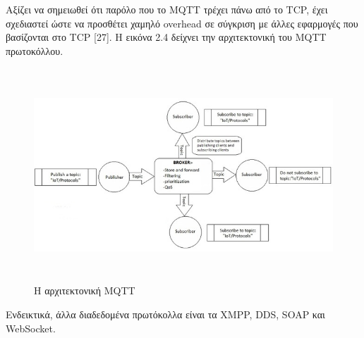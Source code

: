 Aξίζει να σημειωθεί ότι παρόλο που το MQTT τρέχει πάνω από το TCP, έχει σχεδιαστεί ώστε να προσθέτει χαμηλό overhead σε σύγκριση με άλλες εφαρμογές που βασίζονται στο TCP [27]. Η εικόνα 2.4 δείχνει την αρχιτεκτονική του MQTT  πρωτοκόλλου.


\begin{figure}[htbp]
	\centering
		\includegraphics[height=8cm,width=15cm]{Figures/4.jpg}
	\caption{Η αρχιτεκτονική MQTT \cite{Gupta} }	
\end{figure}

Ενδεικτικά, άλλα διαδεδομένα πρωτόκολλα είναι τα XMPP, DDS, SOAP και WebSocket.

